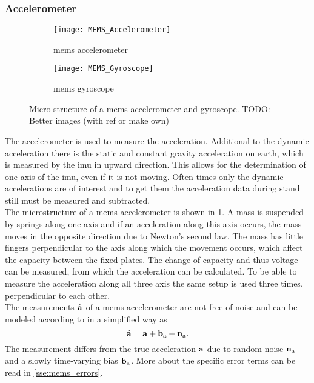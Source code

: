 \subsubsection{ Accelerometer}
\begin{figure}[htb]
	\centering
	\begin{subfigure}{0.48\textwidth}
		\centering
		\texttt{[image: MEMS\_Accelerometer]}
		\caption{\acrshort{mems} accelerometer}
		\label{fig:MEMS_Accelerometer}
	\end{subfigure}
	\begin{subfigure}{0.48\textwidth}
		\centering
		\texttt{[image: MEMS\_Gyroscope]}
		\caption{\acrshort{mems} gyroscope}
		\label{fig:MEMS_Gyroscope}
	\end{subfigure}
	\caption[Micro structure of a \acrshort{mems} accelerometer and gyroscope]{Micro structure of a \acrshort{mems} accelerometer and gyroscope. \color{red}TODO: Better images (with ref or make own)}
	\label{fig:MEMS_design}
\end{figure}
The accelerometer is used to measure the acceleration.
Additional to the dynamic acceleration there is the static and constant gravity acceleration on earth, which is measured by the \gls{imu} in upward direction.
This allows for the determination of one axis of the \gls{imu}, even if it is not moving.
Often times only the dynamic accelerations are of interest and to get them the acceleration data during stand still must be measured and subtracted.\\
The microstructure of a \gls{mems} accelerometer is shown in \cref{fig:MEMS_Accelerometer}.
A mass is suspended by springs along one axis and if an acceleration along this axis occurs, the mass moves in the opposite direction due to Newton's second law.
The mass has little fingers perpendicular to the axis along which the movement occurs, which affect the capacity between the fixed plates.
The change of capacity and thus voltage can be measured, from which the acceleration can be calculated.
To be able to measure the acceleration along all three axis the same setup is used three times, perpendicular to each other.\\
The measurements $\hat{\vb{a}}$ of a \gls{mems} accelerometer are not free of noise and can be modeled according to \cite{Lefferts1982} in a simplified way as
\begin{equation}
	\hat{\vb{a}} = \vb{a} + \vb{b}_\mathrm{a} + \vb{n}_\mathrm{a}.
\end{equation}
The measurement differs from the true acceleration $\vb{a}$ due to random noise $\vb{n}_\mathrm{a}$ and a slowly time-varying bias $\vb{b}_\mathrm{a}$.
More about the specific error terms can be read in \cref{sse:mems_errors}.

